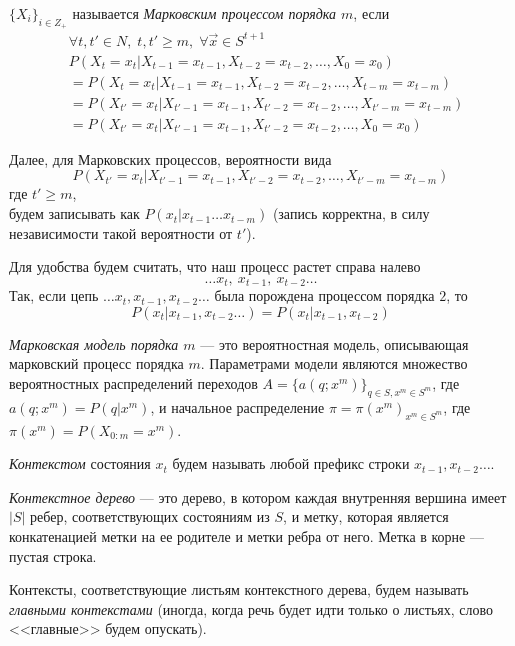 \documentclass{matmex-diploma-custom}
\begin{document}
\begin{definition} $ \{X_{i}\}_{i \in Z_{+}}$ называется \emph{Марковским процессом порядка $ m $}, если  
\begin{align*}
&\forall t, t'\in N, \;t, t' \geq m,\; \forall \overrightarrow{x} \in S^{t+1}
\\&P(X_{t} = x_{t}|X_{t-1}=x_{t-1},X_{t-2}=x_{t-2}, \ldots ,X_{0}=x_{0}) 
\\&=P(X_{t} = x_{t}|X_{t-1}=x_{t-1},X_{t-2}=x_{t-2}, \ldots ,X_{t-m}=x_{t-m})
\\&=P(X_{t'} = x_{t}|X_{t'-1}=x_{t-1},X_{t'-2}=x_{t-2}, \ldots ,X_{t'-m}=x_{t-m})
\\&=P(X_{t'} = x_{t}|X_{t'-1}=x_{t-1},X_{t'-2}=x_{t-2}, \ldots ,X_{0}=x_{0}) 
\end{align*}
\label{MP}
\end{definition}
Далее, для Марковских процессов, вероятности вида  
$$P(X_{t'} = x_{t}|X_{t'-1}=x_{t-1},X_{t'-2}=x_{t-2}, \ldots ,X_{t'-m}=x_{t-m})$$ где $t'\geq m$, 
\\будем записывать как $P(x_{t} |x_{t-1}\ldots x_{t-m})$ (запись корректна, в силу независимости такой вероятности от $t'$).

Для удобства будем считать, что наш процесс растет справа налево  
$$\ldots x_{t},~ x_{t-1},~ x_{t-2} \ldots$$
Так,  если цепь $\ldots x_{t}, x_{t-1}, x_{t-2} \ldots$ была порождена процессом порядка $2$,
то $$P(x_{t}| x_{t-1},x_{t-2}\ldots) = P(x_{t}|x_{t-1},x_{t-2})$$

\begin{definition} \emph{Марковская модель порядка $ m $} --- это вероятностная модель, описывающая марковский процесс порядка $m$. Параметрами модели являются множество вероятностных распределений переходов  $ A = \{a(q; x^{m})\}_{q \in S, x^{m} \in S^{m}}$, где $a(q; x^{m}) = P(q|x^{m})$, и начальное распределение $\pi = \pi(x^m)_{x^m \in S^m}$, где $\pi(x^m) = P(X_{0:m}=x^m)$.
\end{definition}

\textit{Контекстом} состояния $ x_{t} $  будем называть любой префикс строки  $x_{t-1}, x_{t-2} \ldots$. 

\begin{definition}
\textit{Контекстное дерево} --- это дерево, в котором каждая внутренняя вершина имеет $ |S| $ ребер, соответствующих состояниям из $S$, и метку, которая является конкатенацией метки на ее родителе и метки ребра от него. Метка в корне --- пустая строка.
\end{definition}
Контексты, соответствующие листьям контекстного дерева, будем называть \textit{главными контекстами} (иногда, когда речь будет идти только о листьях, слово <<главные>> будем опускать).
\end{document}
